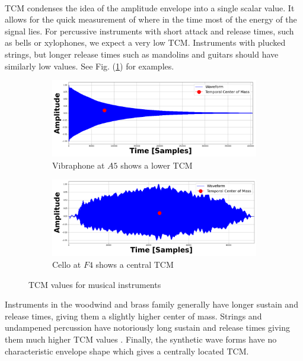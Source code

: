 \documentclass[12pt,letterpaper]{article}
\begin{document}
\paragraph*{}TCM condenses the idea of the amplitude envelope into a single scalar value. It allows for the quick measurement of where in the time most of the energy of the signal lies. For percussive instruments with short attack and release times, such as bells or xylophones, we expect a very low TCM. Instruments with plucked strings, but longer release times such as mandolins and guitars should have similarly low values. See Fig. (\ref{fig-ExampleTCM}) for examples.
\begin{figure}[H]
	\begin{subfigure}[b]{0.45\textwidth}
	\begin{center}
	\includegraphics[width=1.0\linewidth]{../FiguresSpectrogram/Vibraphone-sustain-A5-R_TCM}
	\caption{Vibraphone at $A5$ shows a lower TCM}
	\end{center}
	\end{subfigure}	
	\hfill
	\begin{subfigure}[b]{0.45\textwidth}
	\begin{center}
	\includegraphics[width=1.0\linewidth]{../FiguresSpectrogram/CELLO-F4_TCM}
	\caption{Cello at $F4$ shows a central TCM}
	\end{center}
	\end{subfigure}
	\caption{TCM values for musical instruments}
	\label{fig-ExampleTCM}
\end{figure}
Instruments in the woodwind and brass family generally have longer sustain and release times, giving them a slightly higher center of mass. Strings and undampened percussion have notoriously long sustain and release times giving them much higher TCM values \cite{Olson,White}. Finally, the synthetic wave forms have no characteristic envelope shape which gives a centrally located TCM.
\end{document}
